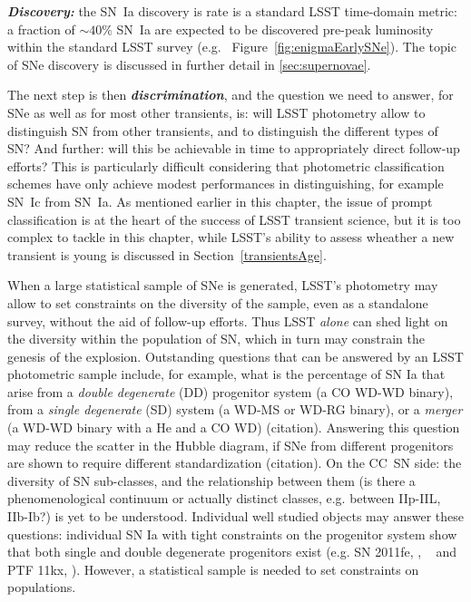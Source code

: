 {\bf \emph{Discovery:}} the SN~Ia discovery is rate is a standard LSST time-domain metric: a
fraction of $\sim40\%$ SN~Ia are expected to be discovered pre-peak
luminosity within the standard LSST survey
(e.g. ~Figure~\ref{fig:enigmaEarlySNe}). The
topic of SNe discovery is discussed in further detail in
\ref{sec:supernovae}.

The next step is then {\bf\emph{discrimination}}, and the question we need
to answer, for SNe as well as for most other transients, is: will LSST
photometry allow to distinguish SN from other transients, and to
distinguish the different types of SN? And further: will this be
achievable in time to appropriately direct follow-up efforts? This is
particularly difficult considering that photometric classification
schemes have only achieve modest performances in distinguishing, for
example SN~Ic from SN~Ia. As mentioned earlier in this chapter, the issue
of prompt classification is at the heart of the success of LSST
transient science, but it is too complex to tackle in this chapter,
while LSST's ability to assess wheather a new transient is young is discussed
in Section~\ref{transientsAge}.

When a large statistical sample of SNe is generated, LSST's photometry
may allow to set constraints on the diversity of the sample, even as a
standalone survey, without the aid of follow-up efforts. Thus LSST
\emph{alone} can shed light on the diversity within the population of SN,
which in turn may constrain the genesis of the explosion. Outstanding
questions that can be answered by an LSST photometric sample include,
for example, what is the percentage of SN Ia that arise from a
\emph{double degenerate} (DD) progenitor system (a CO WD-WD binary), from a
\emph {single degenerate} (SD) system (a WD-MS or WD-RG binary), or a
\emph{merger} (a WD-WD binary with a He and a CO WD)
(citation). Answering this question may reduce the scatter in the
Hubble diagram, if SNe from different progenitors are shown to require
different standardization (citation). On the CC~SN side: the diversity
of SN sub-classes, and the relationship between them (is there a
phenomenological continuum or actually distinct classes, e.g. between
IIp-IIL, IIb-Ib?) is yet to be understood. Individual well studied
objects may answer these questions: individual SN Ia with tight
constraints on the progenitor system show that both single and double
degenerate progenitors exist (e.g. SN 2011fe, \citealt{Li11}, ~\citealt{Olling15} and
PTF 11kx, \citealt{Dilday12}). However, a statistical sample is needed
to set constraints on populations.

